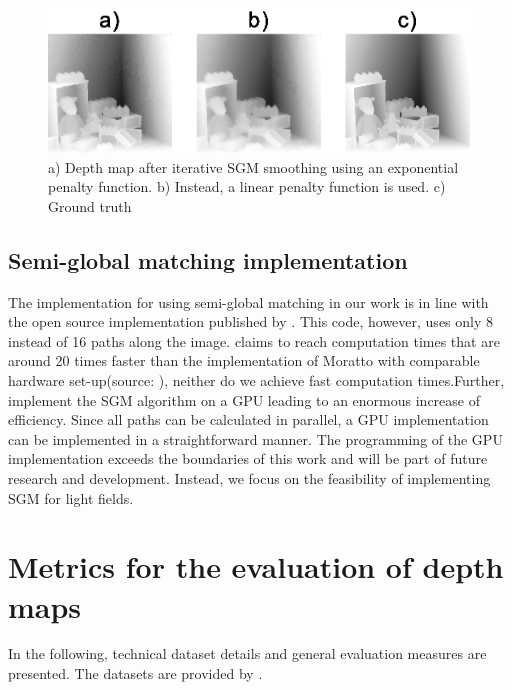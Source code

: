\documentclass  [
  paper    = a4,
  BCOR     = 10mm,
  twoside,
  fontsize = 12pt,
  fleqn,
  toc      = bibnumbered,
  toc      = listofnumbered,
  numbers  = noendperiod,
  headings = normal,
  listof   = leveldown,
  version  = 3.03
]                                       {scrreprt}
\begin{document}
\begin{figure}[h!]
	\centering
	\includegraphics[width=1\linewidth]{images/linear_iteration}
	\caption[Linear cost function vs. exponential cost function results]{a) Depth map after iterative SGM smoothing using an exponential penalty function. b) Instead, a linear penalty function is used. c) Ground truth}
	\label{fig:lineariteration}
\end{figure}
\subsection{Semi-global matching implementation}
\label{sec:SGM_implement}
The implementation for using semi-global matching in our work is in line with the open source implementation published by \cite{sgmimplement}. This code, however, uses only 8 instead of 16 paths along the image. \cite{hirschmuller2005accurate} claims to reach computation times that are around 20 times faster than the implementation of Moratto with comparable hardware set-up(source: \cite{sgmimplement}), neither do we achieve fast computation times.Further, \cite{ernst2008mutual} implement the SGM algorithm on a GPU leading to an enormous increase of efficiency. Since all paths can be calculated in parallel, a GPU implementation can be implemented in a straightforward manner. The programming of the GPU implementation exceeds the boundaries of this work and will be part of future research and development. Instead, we focus on the feasibility of implementing SGM for light fields.
\section{Metrics for the evaluation of depth maps}
In the following, technical dataset details and general evaluation measures are presented. The datasets are provided by \cite{honauer2016benchmark}.
\end{document}
